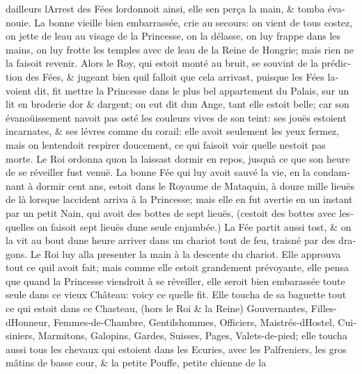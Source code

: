 \documentclass[14pt,a4paper]{memoir}
\begin{document}
\begin{otherlanguage}{french}
d\textquotesingle ailleurs l\textquotesingle Arrest des Fées
l\textquotesingle ordonnoit ainsi, elle s\textquotesingle en perça la
main, \& tomba évanouie. La bonne vieille bien embarrassée, crie au
secours: on vient de tous costez, on jette de l\textquotesingle eau au
visage de la Princesse, on la délasse, on luy frappe dans les mains, on
luy frotte les temples avec de l\textquotesingle eau de la Reine de
Hongrie; mais rien ne la faisoit revenir. Alors le Roy, qui estoit monté
au bruit, se souvint de la prédiction des Fées, \& jugeant bien
qu\textquotesingle il falloit que cela arrivast, puisque les Fées
l\textquotesingle avoient dit, fit mettre la Princesse dans le plus bel
appartement du Palais, sur un lit en broderie d\textquotesingle or \&
d\textquotesingle argent; on eut dit d\textquotesingle un Ange, tant
elle estoit belle; car son évanoüissement n\textquotesingle avoit pas
osté les couleurs vives de son teint: ses jouës estoient incarnates, \&
ses lévres comme du corail: elle avoit seulement les yeux fermez, mais
on l\textquotesingle entendoit respirer doucement, ce qui faisoit voir
qu\textquotesingle elle n\textquotesingle estoit pas morte. Le Roi
ordonna qu\textquotesingle on la laissast dormir en repos,
jusqu\textquotesingle à ce que son heure de se réveiller fust venuë. La
bonne Fée qui luy avoit sauvé la vie, en la condamnant à dormir cent
ans, estoit dans le Royaume de Mataquin, à douze mille lieuës de là
lorsque l\textquotesingle accident arriva à la Princesse; mais elle en
fut avertie en un instant par un petit Nain, qui avoit des bottes de
sept lieuës, (c\textquotesingle estoit des bottes avec lesquelles on
faisoit sept lieuës d\textquotesingle une seule enjambée.) La Fée partit
aussi tost, \& on la vit au bout d\textquotesingle une heure arriver
dans un chariot tout de feu, traisné par des dragons. Le Roi luy alla
presenter la main à la descente du chariot. Elle approuva tout ce
qu\textquotesingle il avoit fait; mais comme elle estoit grandement
prévoyante, elle pensa que quand la Princesse viendroit à se réveiller,
elle seroit bien embarassée toute seule dans ce vieux Château: voicy ce
qu\textquotesingle elle fit. Elle toucha de sa baguette tout ce qui
estoit dans ce Chasteau, (hors le Roi \& la Reine) Gouvernantes,
Filles-d\textquotesingle Honneur, Femmes-de-Chambre, Gentilshommes,
Officiers, Maistrés-d\textquotesingle Hostel, Cuisiniers, Marmitons,
Galopins, Gardes, Suisses, Pages, Valets-de-pied; elle toucha aussi tous
les chevaux qui estoient dans les Ecuries, avec les Palfreniers, les
gros mâtins de basse cour, \& la petite Pouffe, petite chienne de la

\end{otherlanguage}
\end{document}
